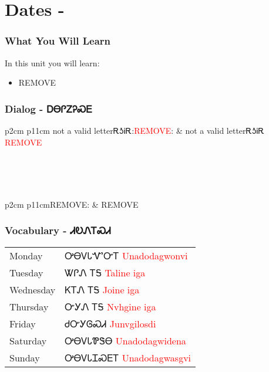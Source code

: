 \index{}
\chapter{Dates - }
\subsection{What You Will Learn}
In this unit you will learn:
\begin{itemize}
\item REMOVE
\end{itemize}\newpage

\newpage\subsection{Dialog - ᎠᎾᎵᏃᎮᏍᎬ}
\begin{tabular}{p{2cm} p{11cm}}
not a valid letterᎡᎼᎥᎡ:\newline \textcolor{red}{REMOVE}: & not a valid letterᎡᎼᎥᎡ 
\newline\textcolor{red}{REMOVE}\\
\end{tabular}
\\
\\
\\
\noindent\begin{tabular}{p{2cm} p{11cm}}REMOVE: & REMOVE\\
\end{tabular}
\vfill\newpage\subsection{Vocabulary - ᏗᎧᏁᎢᏍᏗ 
}
\begin{minipage}{\linewidth}
\begin{tabular}{p{3cm} p{11cm}}
Monday & ᎤᎾᏙᏓᏉᏅᎢ 
 \newline \textcolor{red}{Unadodagwonvi}\\
Tuesday & ᏔᎵᏁ ᎢᎦ 
 \newline \textcolor{red}{Taline iga}\\
Wednesday & ᏦᎢᏁ ᎢᎦ 
 \newline \textcolor{red}{Joine iga}\\
Thursday & ᏅᎩᏁ ᎢᎦ 
 \newline \textcolor{red}{Nvhgine iga}\\
Friday & ᏧᏅᎩᎶᏍᏗ 
 \newline \textcolor{red}{Junvgilosdi}\\
Saturday & ᎤᎾᏙᏓᏈᏕᎾ 
 \newline \textcolor{red}{Unadodagwidena}\\
Sunday & ᎤᎾᏙᏓᏆᏍᎬᎢ 
 \newline \textcolor{red}{Unadodagwasgvi}\\
\end{tabular}
\end{minipage}

